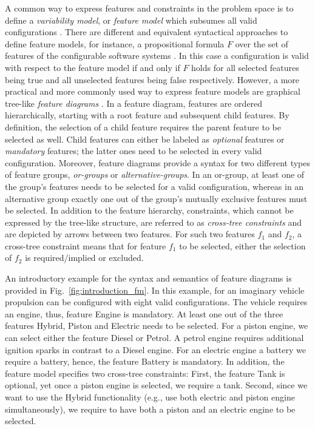A common way to express features and constraints in the problem space is to
define a \emph{variability model}, or \emph{feature model} which subsumes all
valid configurations \citep{apel_feature-oriented_2013}. There are different and equivalent syntactical
approaches to define feature models, for instance, a propositional formula $F$ over the set of
features of the configurable software systems \citep{batory_feature_2005}. In
this case a configuration is valid with respect to the feature model if and only if $F$ holds for all
selected features being true and all unselected features being false respectively. 
However, a more practical and more commonly used way to express feature models
are graphical tree-like \emph{feature diagrams}
\citep{apel_feature-oriented_2013}. In a feature diagram, features are ordered
hierarchically, starting with a root feature and subsequent child features. By
definition, the selection of a child feature requires the parent feature to be
selected as well. Child features can either be labeled as \emph{optional}
features  or \emph{mandatory} features; the latter ones need to be selected in
every valid configuration.
Moreover, feature diagrams
provide a syntax for two different types of feature groups, \emph{or-groups} or
\emph{alternative-groups}. In an or-group, at least one of the group's features
needs to be selected for a valid configuration, whereas in an alternative group
exactly one out of the group's mutually exclusive features must be selected. In
addition to the feature hierarchy, constraints, which cannot be expressed by
the tree-like structure, are referred to as \emph{cross-tree constraints} and
are depicted by arrows between two features. For such two features $f_1$ and $f_2$,
a cross-tree constraint means that for feature $f_1$ to be selected,  either the
selection of $f_2$ is required/implied or excluded.

An introductory example for the syntax and semantics of feature diagrams is
provided in Fig.~\ref{fig:introduction_fm}. In this example, for an imaginary
vehicle propulsion can be configured with eight valid configurations. The vehicle requires an engine,
thus, feature \textsf{Engine} is mandatory. At least one out of the three
features \textsf{Hybrid}, \textsf{Piston} and \textsf{Electric} needs to be
selected. For a piston engine, we can select either the feature \textsf{Diesel}
or \textsf{Petrol}. A petrol engine requires additional ignition sparks in
contrast to a Diesel engine. For an electric engine a battery we require a
battery, hence, the feature \textsf{Battery} is mandatory.
In addition, the feature model specifies two cross-tree constraints: First, the
feature \textsf{Tank} is optional, yet once a piston engine is selected, we
require  a tank. Second, since we want to use the Hybrid functionality (e.g.,
use both electric and piston engine simultaneously), we require to have both a piston
and an electric engine to be selected.

